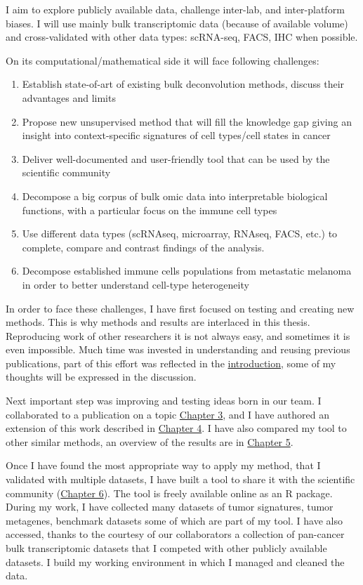 \documentclass[12pt,]{book}
\providecommand{\tightlist}{%
  \setlength{\itemsep}{0pt}\setlength{\parskip}{0pt}}
\theoremstyle{definition}
\theoremstyle{definition}
\theoremstyle{definition}
\theoremstyle{remark}
\begin{document}
I aim to explore publicly available data, challenge inter-lab, and
inter-platform biases. I will use mainly bulk transcriptomic data
(because of available volume) and cross-validated with other data types:
scRNA-seq, FACS, IHC when possible.

On its computational/mathematical side it will face following
challenges:

\begin{enumerate}
\def\labelenumi{\arabic{enumi}.}
\tightlist
\item
  Establish state-of-art of existing bulk deconvolution methods, discuss
  their advantages and limits
\item
  Propose new unsupervised method that will fill the knowledge gap
  giving an insight into context-specific signatures of cell types/cell
  states in cancer
\item
  Deliver well-documented and user-friendly tool that can be used by the
  scientific community
\item
  Decompose a big corpus of bulk omic data into interpretable biological
  functions, with a particular focus on the immune cell types
\item
  Use different data types (scRNAseq, microarray, RNAseq, FACS, etc.) to
  complete, compare and contrast findings of the analysis.
\item
  Decompose established immune cells populations from metastatic
  melanoma in order to better understand cell-type heterogeneity
\end{enumerate}

In order to face these challenges, I have first focused on testing and
creating new methods. This is why methods and results are interlaced in
this thesis. Reproducing work of other researchers it is not always
easy, and sometimes it is even impossible. Much time was invested in
understanding and reusing previous publications, part of this effort was
reflected in the \protect\hyperlink{methods}{introduction}, some of my
thoughts will be expressed in the discussion.

Next important step was improving and testing ideas born in our team. I
collaborated to a publication on a topic
\protect\hyperlink{MSTD}{Chapter 3}, and I have authored an extension of
this work described in \protect\hyperlink{lva}{Chapter 4}. I have also
compared my tool to other similar methods, an overview of the results
are in \protect\hyperlink{nmf}{Chapter 5}.

Once I have found the most appropriate way to apply my method, that I
validated with multiple datasets, I have built a tool to share it with
the scientific community (\protect\hyperlink{deconica}{Chapter 6}). The
tool is freely available online as an R package. During my work, I have
collected many datasets of tumor signatures, tumor metagenes, benchmark
datasets some of which are part of my tool. I have also accessed, thanks
to the courtesy of our collaborators a collection of pan-cancer bulk
transcriptomic datasets that I competed with other publicly available
datasets. I build my working environment in which I managed and cleaned
the data.
\end{document}
